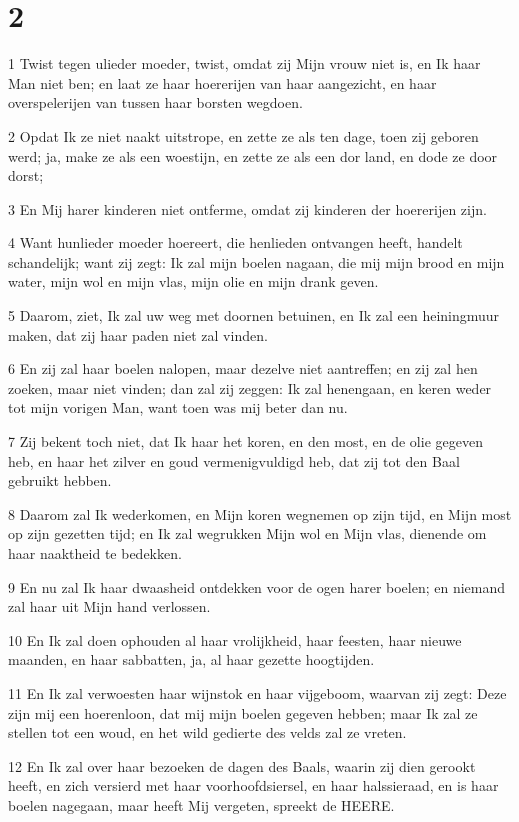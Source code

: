 \chapter{2}

\par 1 Twist tegen ulieder moeder, twist, omdat zij Mijn vrouw niet is, en Ik haar Man niet ben; en laat ze haar hoererijen van haar aangezicht, en haar overspelerijen van tussen haar borsten wegdoen.
\par 2 Opdat Ik ze niet naakt uitstrope, en zette ze als ten dage, toen zij geboren werd; ja, make ze als een woestijn, en zette ze als een dor land, en dode ze door dorst;
\par 3 En Mij harer kinderen niet ontferme, omdat zij kinderen der hoererijen zijn.
\par 4 Want hunlieder moeder hoereert, die henlieden ontvangen heeft, handelt schandelijk; want zij zegt: Ik zal mijn boelen nagaan, die mij mijn brood en mijn water, mijn wol en mijn vlas, mijn olie en mijn drank geven.
\par 5 Daarom, ziet, Ik zal uw weg met doornen betuinen, en Ik zal een heiningmuur maken, dat zij haar paden niet zal vinden.
\par 6 En zij zal haar boelen nalopen, maar dezelve niet aantreffen; en zij zal hen zoeken, maar niet vinden; dan zal zij zeggen: Ik zal henengaan, en keren weder tot mijn vorigen Man, want toen was mij beter dan nu.
\par 7 Zij bekent toch niet, dat Ik haar het koren, en den most, en de olie gegeven heb, en haar het zilver en goud vermenigvuldigd heb, dat zij tot den Baal gebruikt hebben.
\par 8 Daarom zal Ik wederkomen, en Mijn koren wegnemen op zijn tijd, en Mijn most op zijn gezetten tijd; en Ik zal wegrukken Mijn wol en Mijn vlas, dienende om haar naaktheid te bedekken.
\par 9 En nu zal Ik haar dwaasheid ontdekken voor de ogen harer boelen; en niemand zal haar uit Mijn hand verlossen.
\par 10 En Ik zal doen ophouden al haar vrolijkheid, haar feesten, haar nieuwe maanden, en haar sabbatten, ja, al haar gezette hoogtijden.
\par 11 En Ik zal verwoesten haar wijnstok en haar vijgeboom, waarvan zij zegt: Deze zijn mij een hoerenloon, dat mij mijn boelen gegeven hebben; maar Ik zal ze stellen tot een woud, en het wild gedierte des velds zal ze vreten.
\par 12 En Ik zal over haar bezoeken de dagen des Baals, waarin zij dien gerookt heeft, en zich versierd met haar voorhoofdsiersel, en haar halssieraad, en is haar boelen nagegaan, maar heeft Mij vergeten, spreekt de HEERE.
